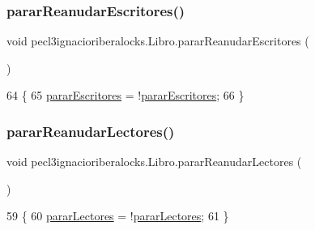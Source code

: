 \subsubsection{\texorpdfstring{parar\+Reanudar\+Escritores()}{pararReanudarEscritores()}}
{\footnotesize\ttfamily void pecl3ignacioriberalocks.\+Libro.\+parar\+Reanudar\+Escritores (\begin{DoxyParamCaption}{ }\end{DoxyParamCaption})\hspace{0.3cm}{\ttfamily [inline]}}


\begin{DoxyCode}
64     \{
65         \mbox{\hyperlink{classpecl3ignacioriberalocks_1_1_libro_af0d9e9c98f0aa4cd5a5aa0c0be6a9fc3}{pararEscritores}} = !\mbox{\hyperlink{classpecl3ignacioriberalocks_1_1_libro_af0d9e9c98f0aa4cd5a5aa0c0be6a9fc3}{pararEscritores}};
66     \}
\end{DoxyCode}
\mbox{\label{classpecl3ignacioriberalocks_1_1_libro_a400ffab628cf38370362f1c7fec24c47}} 
\subsubsection{\texorpdfstring{parar\+Reanudar\+Lectores()}{pararReanudarLectores()}}
{\footnotesize\ttfamily void pecl3ignacioriberalocks.\+Libro.\+parar\+Reanudar\+Lectores (\begin{DoxyParamCaption}{ }\end{DoxyParamCaption})\hspace{0.3cm}{\ttfamily [inline]}}


\begin{DoxyCode}
59     \{
60         \mbox{\hyperlink{classpecl3ignacioriberalocks_1_1_libro_a78afb2edbbd4a15475672b3a967c223a}{pararLectores}} = !\mbox{\hyperlink{classpecl3ignacioriberalocks_1_1_libro_a78afb2edbbd4a15475672b3a967c223a}{pararLectores}};
61     \}
\end{DoxyCode}
\mbox{\label{classpecl3ignacioriberalocks_1_1_libro_acc729cd669b5113fd1ec2a529fd24257}} 
